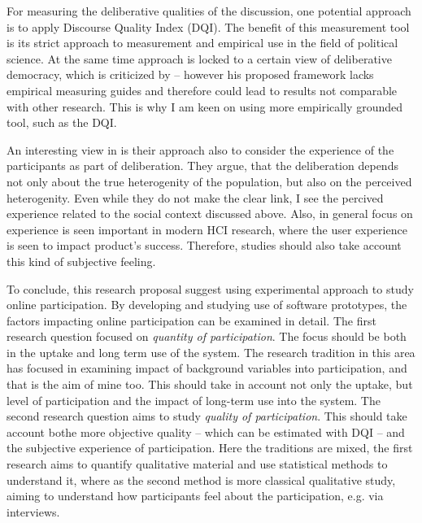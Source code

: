 \documentclass[journal,a4paper]{IEEEtran}
\begin{document}
For measuring the deliberative qualities of the discussion, one potential approach is to apply  Discourse Quality Index (DQI). The benefit of this measurement tool is its strict approach to measurement and empirical use in the field of political science. At the same time  approach is locked to a certain view of deliberative democracy, which is criticized by  -- however his proposed framework lacks empirical measuring guides and therefore could lead to results not comparable with other research. This is why I am keen on using more empirically grounded tool, such as the DQI.

An interesting view in  is their approach also to consider the experience of the participants as part of deliberation. They argue, that the deliberation depends not only about the true heterogenity of the population, but also on the perceived heterogenity. Even while they do not make the clear link, I see the percived experience related to the social context discussed above. Also, in general focus on experience is seen important in modern HCI research, where the user experience is seen to impact product's success. Therefore, studies should also take account this kind of subjective feeling.


To conclude, this research proposal suggest using experimental approach to study online participation. By developing and studying use of software prototypes, the factors impacting online participation can be examined in detail.
The first research question focused on \textit{quantity of participation}. The focus should be both in the uptake and long term use of the system. The research tradition in this area has focused in examining impact of background variables into participation, and that is the aim of mine too. This should take in account not only the uptake, but level of participation and the impact of long-term use into the system.
The second research question aims to study \textit{quality of participation}. This should take account bothe more objective quality -- which can be estimated with DQI -- and the subjective experience of participation. Here the traditions are mixed, the first research aims to quantify qualitative material and use statistical methods to understand it, where as the second method is more classical qualitative study, aiming to understand how participants feel about the participation, e.g. via interviews.



\end{document}
